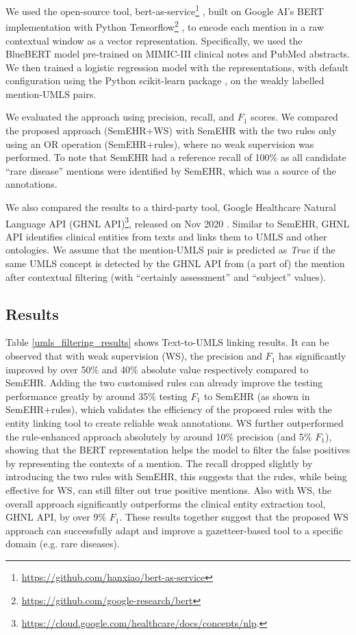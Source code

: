 \documentclass[letterpaper, 10 pt, conference]{ieeeconf}
\begin{document}
We used the open-source tool, bert-as-service\footnote{\url{https://github.com/hanxiao/bert-as-service}} \cite{xiao2019bertservice}, built on Google AI's BERT implementation with Python Tensorflow\footnote{\url{https://github.com/google-research/bert}} \cite{devlin-etal-2019-bert}, to encode each mention in a raw contextual window as a vector representation. Specifically, we used the BlueBERT \cite{peng2019transfer} model pre-trained on MIMIC-III clinical notes and PubMed abstracts. We then trained a logistic regression model with the representations, with default configuration using the Python scikit-learn package \cite{scikit-learn}, on the weakly labelled mention-UMLS pairs.

We evaluated the approach using precision, recall, and $F_1$ scores. We compared the proposed approach (SemEHR+WS) with SemEHR with the two rules only using an OR operation (SemEHR+rules), where no weak supervision was performed. To note that SemEHR had a reference recall of 100\% as all candidate ``rare disease'' mentions were identified by SemEHR, which was a source of the annotations.

We also compared the results to a third-party tool, Google Healthcare Natural Language API (GHNL API)\footnote{\url{https://cloud.google.com/healthcare/docs/concepts/nlp}.}, released on Nov 2020 \cite{Bodnari2020}. Similar to SemEHR, GHNL API identifies clinical entities from texts and links them to UMLS and other ontologies. We assume that the mention-UMLS pair is predicted as \emph{True} if the same UMLS concept is detected by the GHNL API from (a part of) the mention after contextual filtering (with ``certainly assessment'' and ``subject'' values).

\subsection{Results}
Table \ref{umls_filtering_results} shows Text-to-UMLS linking results. It can be observed that with weak supervision (WS), the precision and $F_1$ has significantly improved by over 50\% and 40\% absolute value respectively compared to SemEHR. Adding the two customised rules can already improve the testing performance greatly by around 35\% testing $F_1$ to SemEHR (as shown in SemEHR+rules), which validates the efficiency of the proposed rules with the entity linking tool to create reliable weak annotations. WS further outperformed the rule-enhanced approach absolutely by around 10\% precision (and 5\% $F_1$), showing that the BERT representation helps the model to filter the false positives by representing the contexts of a mention. The recall dropped slightly by introducing the two rules with SemEHR, this suggests that the rules, while being effective for WS, can still filter out true positive mentions. Also with WS, the overall approach significantly outperforms the clinical entity extraction tool, GHNL API, by over 9\% $F_1$. These results together suggest that the proposed WS approach can successfully adapt and improve a gazetteer-based tool to a specific domain (e.g. rare diseases).
\end{document}
